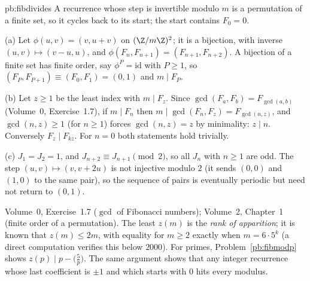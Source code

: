 \begin{solution}{pb:fibdivides}
\idea A recurrence whose step is invertible modulo $m$ is a permutation of a finite set, so it cycles back to its start; the start
contains $F_0=0$.

\writeup (a) Let $\phi(u,v)=(v,u+v)$ on $(\Z/m\Z)^2$; it is a bijection, with inverse $(u,v)\mapsto(v-u,u)$, and
$\phi(F_n,F_{n+1})=(F_{n+1},F_{n+2})$. A bijection of a finite set has finite order, say $\phi^P=\mathrm{id}$ with $P\ge1$, so
$(F_P,F_{P+1})\equiv(F_0,F_1)=(0,1)$ and $m\mid F_P$.

(b) Let $z\ge1$ be the least index with $m\mid F_z$. Since $\gcd(F_a,F_b)=F_{\gcd(a,b)}$ (Volume~0, Exercise~1.7), if $m\mid F_n$ then
$m\mid\gcd(F_n,F_z)=F_{\gcd(n,z)}$, and $\gcd(n,z)\ge1$ (for $n\ge1$) forces $\gcd(n,z)=z$ by minimality: $z\mid n$. Conversely $F_z\mid F_{kz}$.
For $n=0$ both statements hold trivially.

(c) $J_1=J_2=1$, and $J_{n+2}\equiv J_{n+1}\pmod2$, so all $J_n$ with $n\ge1$ are odd. The step $(u,v)\mapsto(v,v+2u)$ is not injective
modulo $2$ (it sends $(0,0)$ and $(1,0)$ to the same pair), so the sequence of pairs is eventually periodic but need not return to
$(0,1)$.

\tools Volume~0, Exercise~1.7 ($\gcd$ of Fibonacci numbers); Volume~2, Chapter~1 (finite order of a permutation).
\leads The least $z(m)$ is the \emph{rank of apparition}; it is known that $z(m)\le2m$, with equality for $m\ge2$ exactly when
$m=6\cdot5^k$ (a direct computation verifies this below $2000$). For primes, Problem~\ref{pb:fibmodp} shows $z(p)\mid p-\bigl(\frac5p\bigr)$. The same argument shows that any integer recurrence
whose last coefficient is $\pm1$ and which starts with $0$ hits every modulus.
\end{solution}

